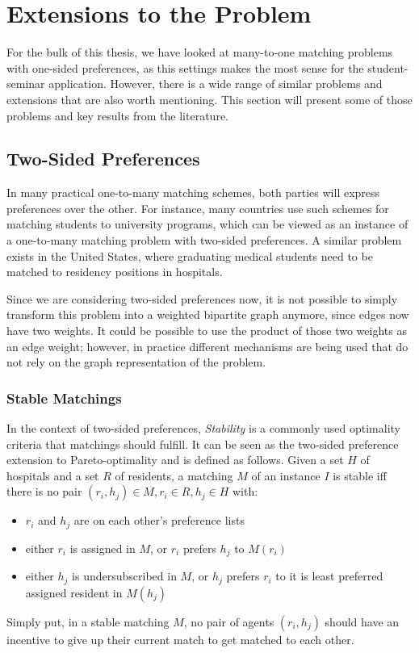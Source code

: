\section{Extensions to the Problem}
For the bulk of this thesis, we have looked at many-to-one matching problems with one-sided preferences, as this settings makes the most sense for the student-seminar application. However, there is a wide range of similar problems and extensions that are also worth mentioning. This section will present some of those problems and key results from the literature. 

\subsection{Two-Sided Preferences}\label{extensions:two-sided}
In many practical one-to-many matching schemes, both parties will express preferences over the other. For instance, many countries use such schemes for matching students to university programs, which can be viewed as an instance of a one-to-many matching problem with two-sided preferences. A similar problem exists in the United States, where graduating medical students need to be matched to residency positions in hospitals. 

Since we are considering two-sided preferences now, it is not possible to simply transform this problem into a weighted bipartite graph anymore, since edges now have two weights. It could be possible to use the product of those two weights as an edge weight; however, in practice different mechanisms are being used that do not rely on the graph representation of the problem.

\subsubsection{Stable Matchings}
In the context of two-sided preferences, \emph{Stability} is a commonly used optimality criteria that matchings should fulfill. It can be seen as the two-sided preference extension to Pareto-optimality and is defined as follows. Given a set $H$ of hospitals and a set $R$ of residents, a matching $M$ of an instance $I$ is stable iff there is no pair $(r_i, h_j) \in M, r_i \in R, h_j \in H$ with:
\begin{itemize}
    \item $r_i$ and $h_j$ are on each other's preference lists
    \item either $r_i$ is assigned in $M$, or $r_i$ prefers $h_j$ to $M(r_i)$
    \item either $h_j$ is undersubscribed in $M$, or $h_j$ prefers $r_i$ to it is least preferred assigned resident in $M(h_j)$
\end{itemize}
Simply put, in a stable matching $M$, no pair of agents $(r_i, h_j)$ should have an incentive to give up their current match to get matched to each other.


